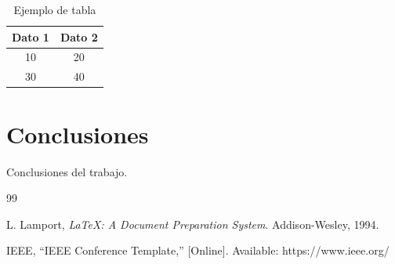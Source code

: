 \documentclass[conference]{IEEEtran}
\begin{document}

\begin{table}[H]
\centering
\caption{Ejemplo de tabla}
\label{tab:ejemplo}
\begin{tabular}{cc}
\toprule
Dato 1 & Dato 2 \\
\midrule
10 & 20 \\
30 & 40 \\
\bottomrule
\end{tabular}
\end{table}

\section{Conclusiones}

Conclusiones del trabajo.


\begin{thebibliography}{99}

L. Lamport,
\textit{\LaTeX: A Document Preparation System}.
Addison-Wesley, 1994.

IEEE,
``IEEE Conference Template,''
[Online]. Available:
https://www.ieee.org/

\end{thebibliography}
\end{document}
